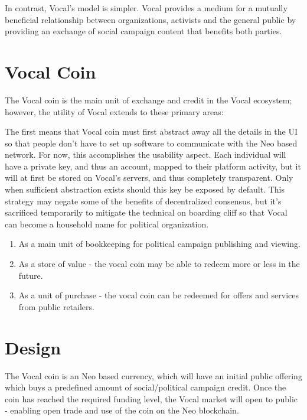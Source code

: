 \documentclass[conference]{IEEEtran}
\begin{document}
    In contrast, Vocal's model is simpler. Vocal provides a medium for a mutually beneficial relationship between organizations, activists and the general public by providing an exchange of social campaign content that benefits both parties.

    \section{Vocal Coin}

    The Vocal coin is the main unit of exchange and credit in the Vocal ecosystem; however, the utility of Vocal extends to these primary areas:

    The first means that Vocal coin must first abstract away all the details in the UI so that people don't have to set up software to communicate with the Neo based network. For now, this accomplishes the usability aspect. Each individual will have a private key, and thus an account, mapped to their platform activity, but it will at first be stored on Vocal's servers, and thus completely transparent. Only when sufficient abstraction exists should this key be exposed by default. This strategy may negate some of the benefits of decentralized consensus, but it's sacrificed temporarily to mitigate the technical on boarding cliff so that Vocal can become a household name for political organization. 

    \begin{enumerate}
      \item As a main unit of bookkeeping for political campaign publishing and viewing.
      \item As a store of value - the vocal coin may be able to redeem more or less in the future.
      \item As a unit of purchase - the vocal coin can be redeemed for offers and services from public retailers.
    \end{enumerate}

    \section{Design}

    The Vocal coin is an Neo based currency, which will have an initial public offering which buys a predefined amount of social/political campaign credit. Once the coin has reached the required funding level, the Vocal market will open to public - enabling open trade and use of the coin on the Neo blockchain.
\end{document}

